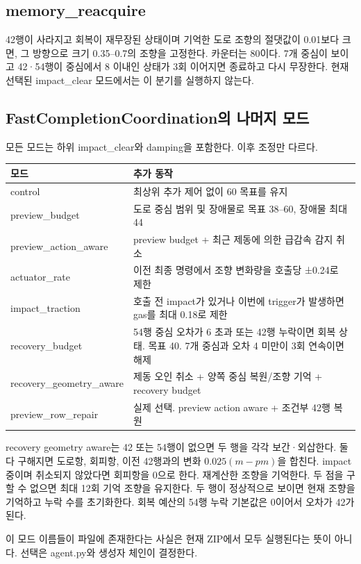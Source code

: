 \documentclass[11pt,a4paper]{article}
\begin{document}
\subsection{memory\_reacquire}
42행이 사라지고 회복이 재무장된 상태이며 기억한 도로 조향의 절댓값이 0.01보다 크면, 그 방향으로 크기 0.35--0.7의 조향을 고정한다. 카운터는 80이다. 7개 중심이 보이고 42·54행이 중심에서 8 이내인 상태가 3회 이어지면 종료하고 다시 무장한다. 현재 선택된 impact\_clear 모드에서는 이 분기를 실행하지 않는다.

\subsection{FastCompletionCoordination의 나머지 모드}
모든 모드는 하위 impact\_clear와 damping을 포함한다. 이후 조정만 다르다.
\begin{longtable}{@{}p{49mm}p{111mm}@{}}\toprule
모드 & 추가 동작 \\\midrule\endhead
control & 최상위 추가 제어 없이 60 목표를 유지 \\
preview\_budget & 도로 중심 범위 및 장애물로 목표 38--60, 장애물 최대 44 \\
preview\_action\_aware & preview budget + 최근 제동에 의한 급감속 감지 취소 \\
actuator\_rate & 이전 최종 명령에서 조향 변화량을 호출당 ±0.24로 제한 \\
impact\_traction & 호출 전 impact가 있거나 이번에 trigger가 발생하면 gas를 최대 0.18로 제한 \\
recovery\_budget & 54행 중심 오차가 6 초과 또는 42행 누락이면 회복 상태. 목표 40. 7개 중심과 오차 4 미만이 3회 연속이면 해제 \\
recovery\_geometry\_aware & 제동 오인 취소 + 양쪽 중심 복원/조향 기억 + recovery budget \\
preview\_row\_repair & 실제 선택. preview action aware + 조건부 42행 복원 \\\bottomrule
\end{longtable}
recovery geometry aware는 42 또는 54행이 없으면 두 행을 각각 보간·외삽한다. 둘 다 구해지면 도로항, 회피항, 이전 42행과의 변화 $0.025(m-pm)$을 합친다. impact 중이며 취소되지 않았다면 회피항을 0으로 한다. 재계산한 조향을 기억한다. 두 점을 구할 수 없으면 최대 12회 기억 조향을 유지한다. 두 행이 정상적으로 보이면 현재 조향을 기억하고 누락 수를 초기화한다. 회복 예산의 54행 누락 기본값은 0이어서 오차가 42가 된다.

이 모드 이름들이 파일에 존재한다는 사실은 현재 ZIP에서 모두 실행된다는 뜻이 아니다. 선택은 agent.py와 생성자 체인이 결정한다.
\end{document}
